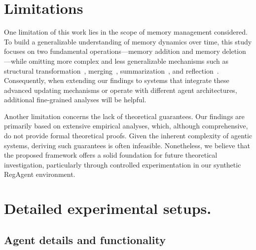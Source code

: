 \documentclass[11pt]{article}
\theoremstyle{plain}
\theoremstyle{definition}
\begin{document}
{\section*{Limitations}
One limitation of this work lies in the scope of memory management considered.
To build a generalizable understanding of memory dynamics over time, this study focuses on two fundamental operations—memory addition and memory deletion—while omitting more complex and less generalizable mechanisms such as structural transformation~\cite{zeng2024structural}, merging~\cite{liu2023think}, summarization~\cite{pan2025memory}, and reflection~\cite{shinn2024reflexion}.
Consequently, when extending our findings to systems that integrate these advanced updating mechanisms or operate with different agent architectures, additional fine-grained analyses will be helpful.

Another limitation concerns the lack of theoretical guarantees.
Our findings are primarily based on extensive empirical analyses, which, although comprehensive, do not provide formal theoretical proofs.
Given the inherent complexity of agentic systems, deriving such guarantees is often infeasible.
Nonetheless, we believe that the proposed framework offers a solid foundation for future theoretical investigation, particularly through controlled experimentation in our synthetic {RegAgent} environment.

% 


\clearpage
\appendix
\section{Detailed experimental setups.}
\label{app:detailed_setup}
\subsection{Agent details and functionality}
\label{app:detail_functionality}
\begin{table}[t!]
\small
\centering
\caption{Details of Agents and Their Functionality}
\end{table}}
\end{document}
